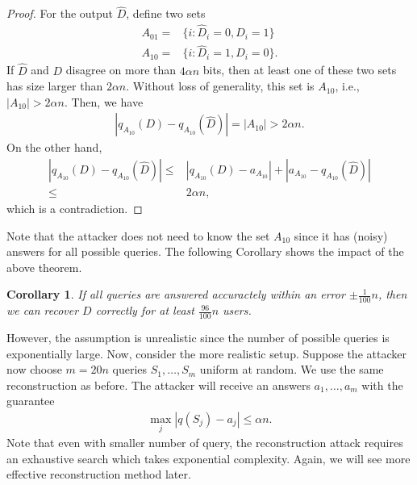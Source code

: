 \documentclass[11pt, a4paper]{article}
\newtheorem{corollary}{Corollary}
\begin{document}
\begin{proof}
    For the output $\hat{D}$, define two sets
    \begin{align}
        A_{01} =& \{i : \hat{D}_i = 0, D_i = 1\}\\
        A_{10} =& \{i : \hat{D}_i = 1, D_i = 0\}.
    \end{align}
    If $\hat{D}$ and $D$ disagree on more than $4\alpha n$ bits, then at least one of these two sets has size larger than $2\alpha n$.
    Without loss of generality, this set is $A_{10}$, i.e., $|A_{10}|>2\alpha n$.
    Then, we have
    \begin{align}
        |q_{A_{10}}(D)- q_{A_{10}}(\hat{D})| = |A_{10}| > 2\alpha n.
    \end{align}
    On the other hand,
    \begin{align}
        |q_{A_{10}}(D)- q_{A_{10}}(\hat{D})| 
                \leq& |q_{A_{10}}(D)- a_{A_{10}}| + |a_{A_{10}} - q_{A_{10}}(\hat{D})| \\
                \leq& 2\alpha n,
    \end{align}
     which is a contradiction. 
\end{proof}
Note that the attacker does not need to know the set $A_{10}$ since it has (noisy) answers for all possible queries.
The following Corollary shows the impact of the above theorem.
\begin{corollary}
    If all queries are answered accuractely within an error $\pm \frac{1}{100}n$, then we can recover $D$ correctly for at least $\frac{96}{100}n$ users.
\end{corollary}

However, the assumption is unrealistic since the number of possible queries is exponentially large.
Now, consider the more realistic setup.
Suppose the attacker now choose $m=20n$ queries $S_1, \dots, S_m$ uniform at random. 
We use the same reconstruction as before.
The attacker will receive an answers $a_1, \dots, a_m$ with the guarantee
\begin{align}
    \max_j |q(S_j) - a_j| \leq \alpha n.
\end{align}
Note that even with smaller number of query, the reconstruction attack requires an exhaustive search which takes exponential complexity.
Again, we will see more effective reconstruction method later.
\end{document}
